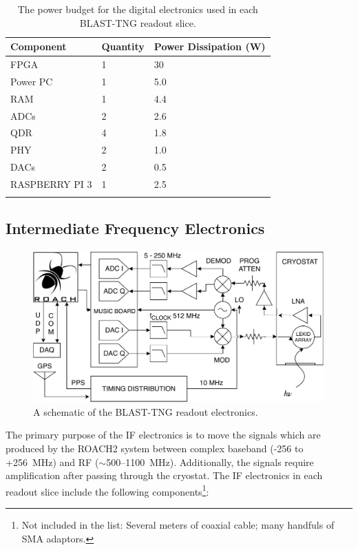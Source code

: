 \begin{table}[!htbp]
\centering
\begin{tabular}{@{}lll@{}}
\dtoprule
Component & Quantity & Power Dissipation (W) \\ \midrule
FPGA & 1 & 30 \\
Power PC & 1 & 5.0 \\
RAM & 1 & 4.4 \\
ADCs & 2 & 2.6 \\
QDR & 4 & 1.8 \\
PHY & 2 & 1.0 \\
DACs & 2 & 0.5 \\
RASPBERRY PI 3 & 1 & 2.5 \\ \dbottomrule
\\
\end{tabular}
\caption[~The power budget for the digital electronics used in each BLAST-TNG readout slice.]{The power budget for the digital electronics used in each BLAST-TNG readout slice.}
\label{tab:dig power budget}
\end{table}

\subsection{Intermediate Frequency Electronics}\label{if electronics}

\begin{figure}
\centering
\includegraphics[width=\textwidth]{figures/readout/schematics/readoutHardwareDiagram2}
\caption{A schematic of the BLAST-TNG readout electronics.}
\label{fig:hw schematic}
\end{figure}

The primary purpose of the IF electronics is to move the signals which are produced by the ROACH2 system between complex baseband (-256 to +256~MHz) and RF ($\sim$500--1100~MHz). Additionally, the signals require amplification after passing through the cryostat. The IF electronics in each readout slice include the following components\footnote{Not included in the list: Several meters of coaxial cable; many handfuls of SMA adaptors.}:


